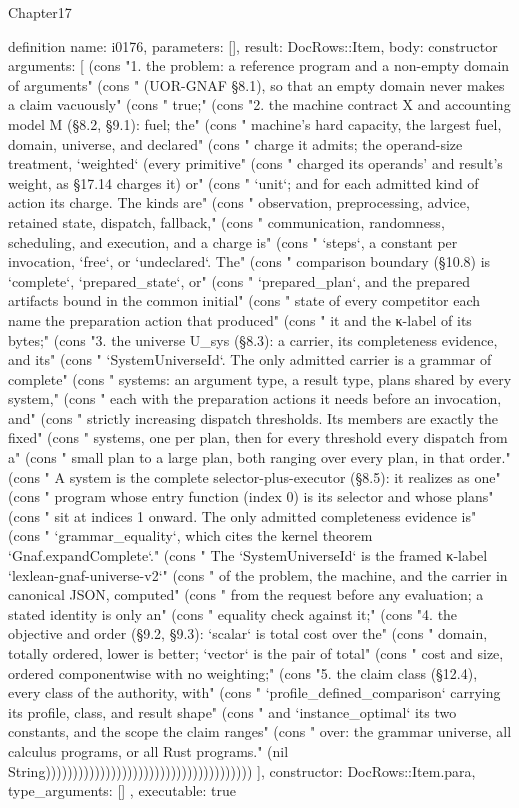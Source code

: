 \begin{lexlean}{Chapter17}
\begin{semanticmodule}
definition{
  name: i0176,
  parameters: [],
  result: DocRows::Item,
  body: constructor{
    arguments: [
      (cons "1. the problem: a reference program and a non-empty domain of arguments" (cons "   (UOR-GNAF §8.1), so that an empty domain never makes a claim vacuously" (cons "   true;" (cons "2. the machine contract X and accounting model M (§8.2, §9.1): fuel; the" (cons "   machine's hard capacity, the largest fuel, domain, universe, and declared" (cons "   charge it admits; the operand-size treatment, `weighted` (every primitive" (cons "   charged its operands' and result's weight, as §17.14 charges it) or" (cons "   `unit`; and for each admitted kind of action its charge. The kinds are" (cons "   observation, preprocessing, advice, retained state, dispatch, fallback," (cons "   communication, randomness, scheduling, and execution, and a charge is" (cons "   `steps`, a constant per invocation, `free`, or `undeclared`. The" (cons "   comparison boundary (§10.8) is `complete`, `prepared_state`, or" (cons "   `prepared_plan`, and the prepared artifacts bound in the common initial" (cons "   state of every competitor each name the preparation action that produced" (cons "   it and the κ-label of its bytes;" (cons "3. the universe U_sys (§8.3): a carrier, its completeness evidence, and its" (cons "   `SystemUniverseId`. The only admitted carrier is a grammar of complete" (cons "   systems: an argument type, a result type, plans shared by every system," (cons "   each with the preparation actions it needs before an invocation, and" (cons "   strictly increasing dispatch thresholds. Its members are exactly the fixed" (cons "   systems, one per plan, then for every threshold every dispatch from a" (cons "   small plan to a large plan, both ranging over every plan, in that order." (cons "   A system is the complete selector-plus-executor (§8.5): it realizes as one" (cons "   program whose entry function (index 0) is its selector and whose plans" (cons "   sit at indices 1 onward. The only admitted completeness evidence is" (cons "   `grammar_equality`, which cites the kernel theorem `Gnaf.expandComplete`." (cons "   The `SystemUniverseId` is the framed κ-label `lexlean-gnaf-universe-v2`" (cons "   of the problem, the machine, and the carrier in canonical JSON, computed" (cons "   from the request before any evaluation; a stated identity is only an" (cons "   equality check against it;" (cons "4. the objective and order (§9.2, §9.3): `scalar` is total cost over the" (cons "   domain, totally ordered, lower is better; `vector` is the pair of total" (cons "   cost and size, ordered componentwise with no weighting;" (cons "5. the claim class (§12.4), every class of the authority, with" (cons "   `profile_defined_comparison` carrying its profile, class, and result shape" (cons "   and `instance_optimal` its two constants, and the scope the claim ranges" (cons "   over: the grammar universe, all calculus programs, or all Rust programs." (nil String))))))))))))))))))))))))))))))))))))))
    ],
    constructor: DocRows::Item.para,
    type_arguments: []
  },
  executable: true
}


\end{semanticmodule}
\end{lexlean}
